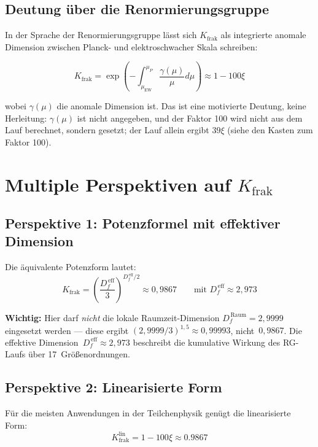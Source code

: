 	\subsection{Deutung über die Renormierungsgruppe}
	
	In der Sprache der Renormierungsgruppe lässt sich $K_{\text{frak}}$ als integrierte anomale Dimension zwischen Planck- und elektroschwacher Skala schreiben:
	
	\begin{equation}
		K_{\text{frak}} = \exp\left(-\int_{\mu_{\text{EW}}}^{\mu_P} \frac{\gamma(\mu)}{\mu} d\mu\right) \approx 1 - 100\xi
	\end{equation}
	
	wobei $\gamma(\mu)$ die anomale Dimension ist. Das ist eine motivierte Deutung, keine Herleitung: $\gamma(\mu)$ ist nicht angegeben, und der Faktor 100 wird nicht aus dem Lauf berechnet, sondern gesetzt; der Lauf allein ergibt $39\xi$ (siehe den Kasten zum Faktor 100).
	
	\section{Multiple Perspektiven auf $K_{\text{frak}}$}
	
	\subsection{Perspektive 1: Potenzformel mit effektiver Dimension}
	
	Die äquivalente Potenzform lautet:
	\begin{equation}
		K_{\text{frak}} = \left(\frac{D_f^{\,\text{eff}}}{3}\right)^{D_f^{\,\text{eff}}/2} \approx 0{,}9867 \qquad \text{mit } D_f^{\,\text{eff}} \approx 2{,}973
		\label{eq:exact_kfrak}
	\end{equation}
	
	\textbf{Wichtig:} Hier darf \emph{nicht} die lokale Raumzeit-Dimension $D_f^{\,\text{Raum}} = 2{,}9999$ eingesetzt werden --- diese ergibt $(2{,}9999/3)^{1{,}5} \approx 0{,}99993$, nicht~$0{,}9867$. Die effektive Dimension~$D_f^{\,\text{eff}} \approx 2{,}973$ beschreibt die kumulative Wirkung des RG-Laufs über 17~Größenordnungen.
	
	\subsection{Perspektive 2: Linearisierte Form}
	
	Für die meisten Anwendungen in der Teilchenphysik genügt die linearisierte Form:
	\begin{equation}
		K_{\text{frak}}^{\text{lin}} = 1 - 100\xi \approx 0.9867
		\label{eq:linear_kfrak}
	\end{equation}
	
